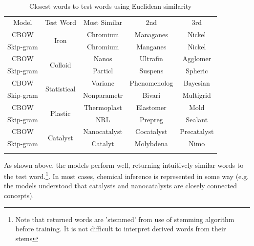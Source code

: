\begin{table}[h!]
\begin{center}
\caption[Word similarity examinations with euclidean similarity]{Closest words to test words using Euclidean similarity}
\label{tab:EUCLIDSIMS}
\begin{tabular}{||c||c|c|c|c||}
\hline
Model     & Test Word              & Most Similar & 2nd & 3rd \\ \hhline{||=||=|=|=|=||}
CBOW      & \multirow{2}{*}{Iron} & Chromium             &  Managanes   &   Nickel  \\ \cline{1-1} \cline{3-5} 
Skip-gram &                   &  Chromium            &   Manganes  &  Nickel   \\ 
\hhline{||=||=|=|=|=||}
CBOW      & \multirow{2}{*}{Colloid} & Nanos             &  Ultrafin   &   Agglomer  \\ \cline{1-1} \cline{3-5} 
Skip-gram &                   &  Particl            &   Suspens  &  Spheric   \\ 
\hhline{||=||=|=|=|=||}
CBOW      & \multirow{2}{*}{Statistical} & Varianc             &  Phenomenolog   &   Bayesian  \\ \cline{1-1} \cline{3-5} 
Skip-gram &                   &  Nonparametr            &   Bivari  &  Multigrid   \\ 
\hhline{||=||=|=|=|=||}
CBOW      & \multirow{2}{*}{Plastic} & Thermoplast             &  Elastomer   & Mold    \\ \cline{1-1} \cline{3-5} 
Skip-gram &                   &  NRL            &   Prepreg  &  Sealant   \\ 
\hhline{||=||=|=|=|=||}
CBOW      & \multirow{2}{*}{Catalyst} & Nanocatalyst             &  Cocatalyst   & Precatalyst    \\ \cline{1-1} \cline{3-5} 
Skip-gram &                   &  Catalyt            &   Molybdena  &  Nimo   \\ 
\hhline{||=||=|=|=|=||}
\end{tabular}
\end{center}
\end{table}
As shown above, the models perform well, returning intuitively similar words to the test word.\footnote{Note that returned words are 'stemmed' from use of stemming algorithm before training. It is not difficult to interpret derived words from their stems}. In most cases, chemical inference is represented in some way (e.g. the models understood that catalysts and nanocatalysts are closely connected concepts).


